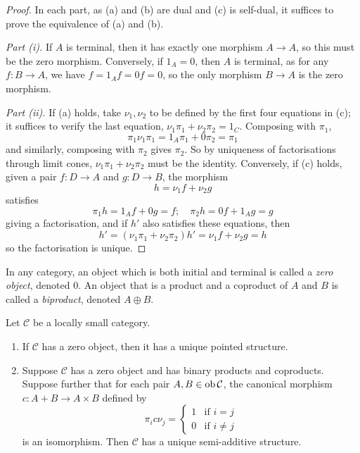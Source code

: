 \begin{proof}
    In each part, as (a) and (b) are dual and (c) is self-dual, it suffices to prove the equivalence of (a) and (b).

    \emph{Part (i).}
    If \( A \) is terminal, then it has exactly one morphism \( A \to A \), so this must be the zero morphism.
    Conversely, if \( 1_A = 0 \), then \( A \) is terminal, as for any \( f : B \to A \), we have \( f = 1_A f = 0 f = 0 \), so the only morphism \( B \to A \) is the zero morphism.

    \emph{Part (ii).}
    If (a) holds, take \( \nu_1, \nu_2 \) to be defined by the first four equations in (c); it suffices to verify the last equation, \( \nu_1 \pi_1 + \nu_2 \pi_2 = 1_C \).
    Composing with \( \pi_1 \),
    \[ \pi_1 \nu_1 \pi_1 = 1_A \pi_1 + 0 \pi_2 = \pi_1 \]
    and similarly, composing with \( \pi_2 \) gives \( \pi_2 \).
    So by uniqueness of factorisations through limit cones, \( \nu_1 \pi_1 + \nu_2 \pi_2 \) must be the identity.
    Conversely, if (c) holds, given a pair \( f : D \to A \) and \( g : D \to B \), the morphism
    \[ h = \nu_1 f + \nu_2 g \]
    satisfies
    \[ \pi_1 h = 1_A f + 0 g = f;\quad \pi_2 h = 0 f + 1_A g = g \]
    giving a factorisation, and if \( h' \) also satisfies these equations, then
    \[ h' = (\nu_1 \pi_1 + \nu_2 \pi_2) h' = \nu_1 f + \nu_2 g = h \]
    so the factorisation is unique.
\end{proof}
In any category, an object which is both initial and terminal is called a \emph{zero object}, denoted \( 0 \).
An object that is a product and a coproduct of \( A \) and \( B \) is called a \emph{biproduct}, denoted \( A \oplus B \).
\begin{lemma}
    Let \( \mathcal C \) be a locally small category.
    \begin{enumerate}
        \item If \( \mathcal C \) has a zero object, then it has a unique pointed structure.
        \item Suppose \( \mathcal C \) has a zero object and has binary products and coproducts.
        Suppose further that for each pair \( A, B \in \operatorname{ob} \mathcal C \), the canonical morphism \( c : A + B \to A \times B \) defined by
        \[ \pi_i c \nu_j = \begin{cases}
            1 & \text{if } i = j \\
            0 & \text{if } i \neq j
        \end{cases} \]
        is an isomorphism.
        Then \( \mathcal C \) has a unique semi-additive structure.
    \end{enumerate}
\end{lemma}

